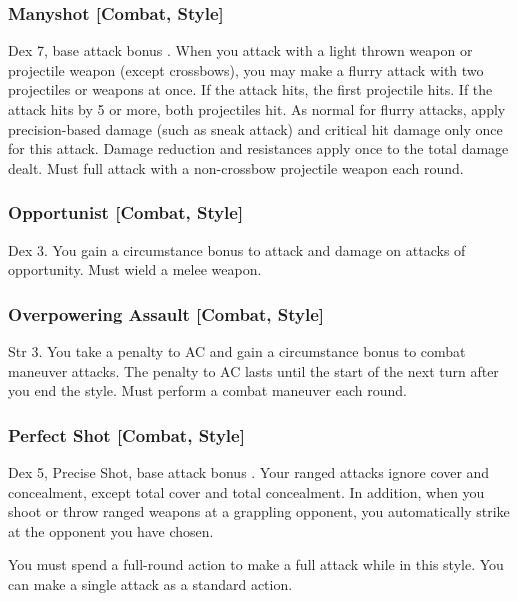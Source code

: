 \subsubsection{Manyshot [Combat, Style]}
 Dex 7, base attack bonus .
 When you attack with a light thrown weapon or projectile weapon (except crossbows), you may make a flurry attack with two projectiles or weapons at once. If the attack hits, the first projectile hits. If the attack hits by 5 or more, both projectiles hit. As normal for flurry attacks, apply precision-based damage (such as sneak attack) and critical hit damage only once for this attack. Damage reduction and resistances apply once to the total damage dealt.
 Must full attack with a non-crossbow projectile weapon each round.

\subsubsection{Opportunist [Combat, Style]}
 Dex 3.
 You gain a  circumstance bonus to attack and damage on attacks of opportunity. \babscalingdescription
{} Must wield a melee weapon.

\subsubsection{Overpowering Assault [Combat, Style]}
 Str 3.
 You take a  penalty to AC and gain a  circumstance bonus to combat maneuver attacks. \babscalingdescription The penalty to AC lasts until the start of the next turn after you end the style.
 Must perform a combat maneuver each round.

\subsubsection{Perfect Shot [Combat, Style]}
 Dex 5, Precise Shot, base attack bonus .
 Your ranged attacks ignore cover and concealment, except total cover and total concealment. In addition, when you shoot or throw ranged weapons at a grappling opponent, you automatically strike at the opponent you have chosen.

You must spend a full-round action to make a full attack while in this style. You can make a single attack as a standard action.

